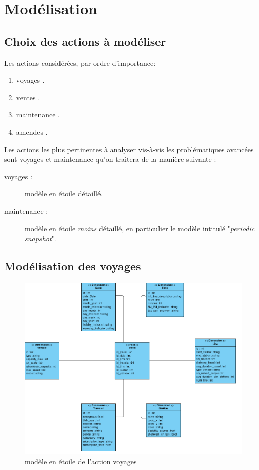 \documentclass[a4paper,12pt]{report}
\begin{document}
\chapter{Modélisation}
\section{Choix des actions à modéliser}
Les actions considérées, par ordre d'importance:
\begin{enumerate}
  \item \og voyages \fg.
  \item \og ventes \fg.
  \item \og maintenance \fg.
  \item \og amendes \fg.
\end{enumerate}

Les actions les plus pertinentes à analyser vis-à-vis les problématiques avancées sont \og voyages \fg et \og maintenance \fg qu'on traitera de la manière suivante :
\begin{description}
  \item [voyages :] modèle en étoile détaillé.
  \item [maintenance :] modèle en étoile \textit{moins} détaillé, en particulier le modèle intitulé "\textit{periodic snapshot}".
\end{description}

\section{Modélisation des voyages}
\begin{figure}[!ht]
  \centering
  \includegraphics[scale=0.4]{images/voyages_datamart.png}
  \caption{modèle en étoile de l'action \og voyages \fg}
\end{figure}
\end{document}
